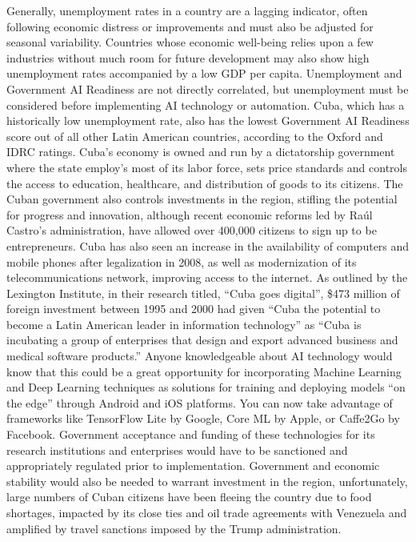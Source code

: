 \documentclass[conference]{IEEEtran}
\begin{document}
Generally, unemployment rates in a country are a lagging indicator, often following economic distress or improvements and must also be adjusted for seasonal variability. Countries whose economic well-being relies upon a few industries without much room for future development may also show high unemployment rates accompanied by a low GDP per capita. Unemployment and Government AI Readiness are not directly correlated, but unemployment must be considered before implementing AI technology or automation.
Cuba, which has a historically low unemployment rate, also has the lowest Government AI Readiness score out of all other Latin American countries, according to the Oxford and IDRC ratings. Cuba's economy is owned and run by a dictatorship government where the state employ's most of its labor force, sets price standards and controls the access to education, healthcare, and distribution of goods to its citizens. The Cuban government also controls investments in the region, stifling the potential for progress and innovation, although recent economic reforms led by Raúl Castro's administration, have allowed over 400,000 citizens to sign up to be entrepreneurs.
Cuba has also seen an increase in the availability of computers and mobile phones after legalization in 2008, as well as modernization of its telecommunications network, improving access to the internet. As outlined by the Lexington Institute, in their research titled, ``Cuba goes digital'', \$473 million of foreign investment between 1995 and 2000 had given ``Cuba the potential to become a Latin American leader in information technology'' as ``Cuba is incubating a group of enterprises that design and export advanced business and medical software products.'' Anyone knowledgeable about AI technology would know that this could be a great opportunity for incorporating Machine Learning and Deep Learning techniques as solutions for training and deploying models ``on the edge'' through Android and iOS platforms. You can now take advantage of frameworks like TensorFlow Lite by Google, Core ML by Apple, or Caffe2Go by Facebook.
Government acceptance and funding of these technologies for its research institutions and enterprises would have to be sanctioned and appropriately regulated prior to implementation. Government and economic stability would also be needed to warrant investment in the region, unfortunately, large numbers of Cuban citizens have been fleeing the country due to food shortages, impacted by its close ties and oil trade agreements with Venezuela and amplified by travel sanctions imposed by the Trump administration.
\end{document}
